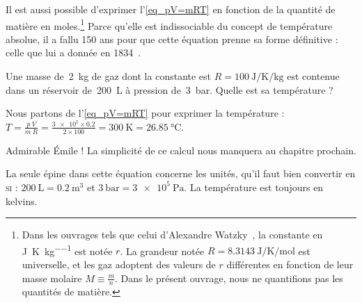 		Il est aussi possible d’exprimer l’\cref{eq_pV=mRT} en fonction de la quantité de matière en \si{moles}.\footnote{Dans les ouvrages tels que celui d’Alexandre Watzky~\cite{watzky2007}, la constante en \si{\joule\per\kelvin\per\kilogram} est notée $r$. La grandeur notée $R = \SI{8,3143}{\joule\per\kelvin\per\mole}$ est universelle, et les gaz adoptent des valeurs de $r$ différentes en fonction de leur masse molaire $M \equiv \frac{m}{n}$. Dans le présent ouvrage, nous ne quantifions pas les quantités de matière.}
		 Parce qu’elle est indissociable du concept de température absolue, il a fallu 150 ans pour que cette équation prenne sa forme définitive : celle que lui a donnée  en 1834~\cite{clapeyron1834}.

			\begin{anexample}
				Une masse de~\SI{2}{\kilogram} de gaz dont la constante est $R = \SI{100}{\joule\per\kelvin\per\kilogram}$ est contenue dans un réservoir de~\SI{200}{\liter} à pression de~\SI{3}{\bar}. Quelle est sa température ?
				\begin{answer}
					Nous partons de l’\cref{eq_pV=mRT} pour exprimer la température : $T = \frac{p \ V}{m \ R} = \frac{\num{3e5} \times \num{0,2}}{2 \times \num{100}} = \SI{300}{\kelvin} = \SI{26,85}{\degreeCelsius}$.
				\end{answer}
					\begin{remark}Admirable Émile ! La simplicité de ce calcul nous manquera au chapitre prochain.\end{remark}
					\begin{remark}La seule épine dans cette équation concerne les unités, qu’il faut bien convertir en \textsc{si} : $\SI{200}{\liter} = \SI{0,2}{\metre\cubed}$ et $\SI{3}{\bar} = \SI{3e5}{\pascal}$. La température est toujours en \si{kelvins}. \end{remark}
			\end{anexample}

